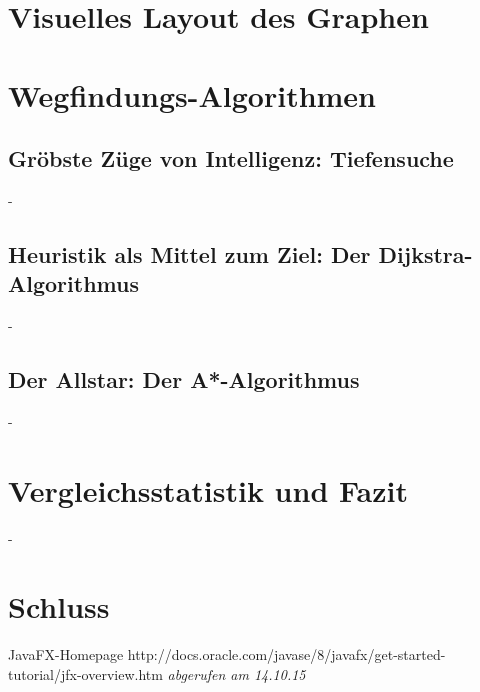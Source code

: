 \documentclass[12pt]{article}
\begin{document}
\section{Visuelles Layout des Graphen}
\label{sec:layout}
\newpage

\section{Wegfindungs-Algorithmen}
\newpage

\subsection{Gröbste Züge von Intelligenz: Tiefensuche}
\newpage
-
\newpage

\subsection{Heuristik als Mittel zum Ziel: Der Dijkstra-Algorithmus}
\newpage
-
\newpage

\subsection{Der Allstar: Der A*-Algorithmus}
\newpage
-
\newpage

\section{Vergleichsstatistik und Fazit}
\newpage
-
\newpage

\section{Schluss}
\newpage

\begin{thebibliography}{9}
 JavaFX-Homepage http://docs.oracle.com/javase/8/javafx/get-started-tutorial/jfx-overview.htm \emph{abgerufen am 14.10.15}
\end{thebibliography}
\end{document}
